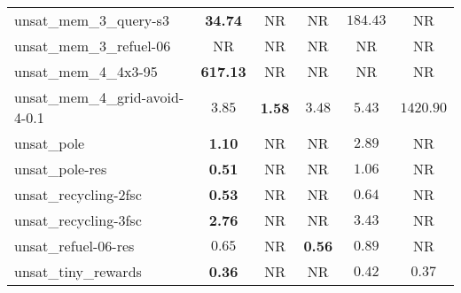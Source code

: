 \begin{tabular}{lccccc}
unsat\_mem\_3\_query-s3 & \textbf{34.74} & NR & NR & $184.43$ & NR \\
unsat\_mem\_3\_refuel-06 & NR & NR & NR & NR & NR \\
unsat\_mem\_4\_4x3-95 & \textbf{617.13} & NR & NR & NR & NR \\
unsat\_mem\_4\_grid-avoid-4-0.1 & $3.85$ & \textbf{1.58} & $3.48$ & $5.43$ & $1420.90$ \\
unsat\_pole & \textbf{1.10} & NR & NR & $2.89$ & NR \\
unsat\_pole-res & \textbf{0.51} & NR & NR & $1.06$ & NR \\
unsat\_recycling-2fsc & \textbf{0.53} & NR & NR & $0.64$ & NR \\
unsat\_recycling-3fsc & \textbf{2.76} & NR & NR & $3.43$ & NR \\
unsat\_refuel-06-res & $0.65$ & NR & \textbf{0.56} & $0.89$ & NR \\
unsat\_tiny\_rewards & \textbf{0.36} & NR & NR & $0.42$ & $0.37$ \\
\bottomrule
\end{tabular}
